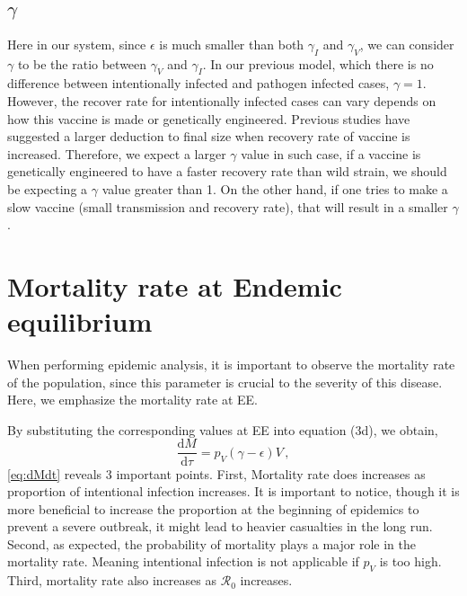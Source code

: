 \documentclass[12pt]{article}
\newcommand\dbyd[2]{\frac{\mathrm d{#1}}{\mathrm d{#2}}}
\newcommand{\R}{\mathcal{R}}
\newcommand{\pmV}{p_{V}}
\begin{document}
\subsection{$\gamma$}
Here in our system, since $\epsilon$ is much smaller than both $\gamma_I$ and $\gamma_V$, we can consider $\gamma$ to be the ratio between $\gamma_V$ and $\gamma_I$. In our previous model, which there is no difference between intentionally infected and pathogen infected cases, $\gamma=1$. However, the recover rate for intentionally infected cases can vary depends on how this vaccine is made or genetically engineered. Previous studies have suggested a larger deduction to final size when recovery rate of vaccine is increased. Therefore, we expect a larger $\gamma$ value in such case, if a vaccine is genetically engineered to have a faster recovery rate than wild strain, we should be expecting a $\gamma$ value greater than 1. On the other hand, if one tries to make a slow vaccine (small transmission and recovery rate), that will result in a smaller $\gamma$.
\section{Mortality rate at Endemic equilibrium}
When performing epidemic analysis, it is important to observe the mortality rate of the population, since this parameter is crucial to the severity of this disease. Here, we emphasize the mortality rate at EE.

By substituting the corresponding values at EE into equation (3d), we obtain,
\begin{equation}
\dbyd{M}{\tau}=\pmV(\gamma-\epsilon)V\,, \label{eq:dMdt}
\end{equation}
\autoref{eq:dMdt} reveals 3 important points. First, Mortality rate does increases as proportion of intentional infection increases. It is important to notice, though it is more beneficial to increase the proportion at the beginning of epidemics to prevent a severe outbreak, it might lead to heavier casualties in the long run. Second, as expected, the probability of mortality plays a major role in the mortality rate. Meaning intentional infection is not applicable if $\pmV$ is too high. Third, mortality rate also increases as $\R_0$ increases. 
\end{document}
